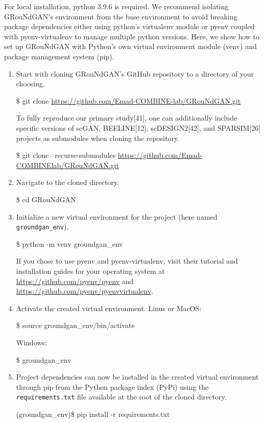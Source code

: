 For local installation, python 3.9.6 is required. We recommend isolating GRouNdGAN’s
environment from the base environment to avoid breaking package dependencies either using
python’s virtualenv module or pyenv coupled with pyenv-virtualenv to manage multiple python
versions. Here, we show how to set up GRouNdGAN with Python’s own virtual environment
module (venv) and package management system (pip). 
\begin{enumerate}
    \item Start with cloning GRouNdGAN’s GitHub repository to a directory of your choosing.
\begin{codeblock}
\$ git clone \url{https://github.com/Emad-COMBINE-lab/GRouNdGAN.git}
\end{codeblock}
To fully reproduce our primary study[41], one can additionally include specific versions of scGAN,
BEELINE[12], scDESIGN2[42], and SPARSIM[26] projects as submodules when cloning the
repository. 
\begin{codeblock}
\$ git clone --recurse-submodules \url{https://github.com/Emad-COMBINElab/GRouNdGAN.git}
\end{codeblock}
    \item Navigate to the cloned directory.
\begin{codeblock}
\$ cd GRouNdGAN
\end{codeblock}
    \item Initialize a new virtual environment for the project (here named \texttt{groundgan\_env}).
\begin{codeblock}
\$ python -m venv groundgan\_env
\end{codeblock}
If you chose to use pyenv and pyenv-virtualenv, visit their tutorial and installation guides for your
operating system at \url{https://github.com/pyenv/pyenv} and \url{https://github.com/pyenv/pyenvvirtualenv}.
    \item Activate the created virtual environment.
Linus or MacOS:
\begin{codeblock}
\$ source groundgan\_env/bin/activate
\end{codeblock}
Windows:
\begin{codeblock}
\$ groundgan\_env \Scripts\activate
\end{codeblock}
    \item Project dependencies can now be installed in the created virtual environment through pip from
the Python package index (PyPi) using the \texttt{requirements.txt} file available at the root of the
cloned directory.
\begin{codeblock}
(groundgan\_env)\$ pip install -r requirements.txt
\end{codeblock}
\end{enumerate}

